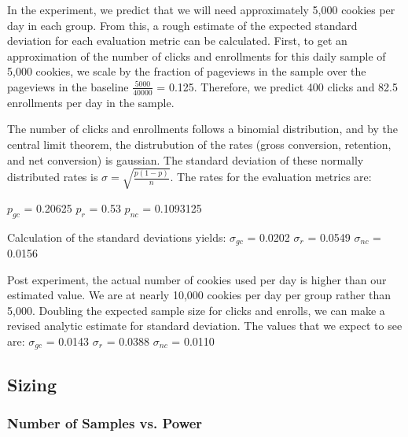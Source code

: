 \documentclass[paper=a4, fontsize=11pt]{scrartcl} %
\numberwithin{equation}{section} %
\numberwithin{figure}{section} %
\numberwithin{table}{section} %
\begin{document}
In the experiment, we predict that we will need approximately 5,000 cookies per day in each group.  From this, a rough estimate of the expected standard deviation for each evaluation metric can be calculated.  First, to get an approximation of the number of clicks and enrollments for this daily sample of 5,000 cookies, we scale by the fraction of pageviews in the sample over the pageviews in the baseline $\frac{5000}{40000}$ = 0.125.  Therefore, we predict 400 clicks and 82.5 enrollments per day in the sample. \newline

The number of clicks and enrollments follows a binomial distribution, and by the central limit theorem, the distrubution of the rates (gross conversion, retention, and net conversion) is gaussian. The standard deviation of these normally distributed rates is $\sigma = \sqrt{\frac{p(1-p)}{n}}$.  The rates for the evaluation metrics are: \newline

$p_{gc}$ = 0.20625\quad
$p_{r}$ = 0.53\quad
$p_{nc}$ = 0.1093125
\newline

Calculation of the standard deviations yields: \newline \newline
$\sigma_{gc}$ = 0.0202\quad
$\sigma_{r}$ = 0.0549\quad
$\sigma_{nc}$ = 0.0156
\newline

Post experiment, the actual number of cookies used per day is higher than our estimated value.  We are at nearly 10,000 cookies per day per group rather than 5,000.  Doubling the expected sample size for clicks and enrolls, we can make a revised analytic estimate for standard deviation.  The values that we expect to see are:
\newline
\newline
$\sigma_{gc}$ = 0.0143\quad
$\sigma_{r}$ = 0.0388\quad
$\sigma_{nc}$ = 0.0110
\newline


\subsection{Sizing}

\subsubsection{Number of Samples vs. Power}
\end{document}
